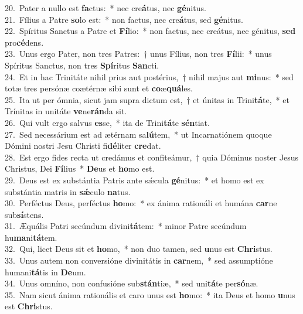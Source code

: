 {20.~}Pater a nullo est \textbf{fa}ctus:~* nec cre\textbf{á}tus, nec \textbf{gé}nitus.\\
{21.~}Fílius a Patre \textbf{so}lo est:~* non factus, nec cre\textbf{á}tus, sed \textbf{gé}nitus.\\
{22.~}Spíritus Sanctus a Patre et \textbf{Fí}lio:~* non factus, nec creátus, nec génitus, \textbf{sed} pro\textbf{cé}dens.\\
{23.~}Unus ergo Pater, non tres Patres:~† unus Fílius, non tres \textbf{Fí}lii:~* unus Spíritus Sanctus, non tres \textbf{Spí}ritus \textbf{San}cti.\\
{24.~}Et in hac Trinitáte nihil prius aut postérius,~† nihil majus aut \textbf{mi}nus:~* sed totæ tres persónæ coætérnæ sibi sunt et \textbf{co}æ\textbf{quá}les.\\
{25.~}Ita ut per ómnia, sicut jam supra dictum est,~† et únitas in Trini\textbf{tá}te,~* et Trínitas in unitáte \textbf{ve}ne\textbf{rán}da sit.\\
{26.~}Qui vult ergo salvus \textbf{es}se,~* ita de Trini\textbf{tá}te \textbf{sén}tiat.\\
{27.~}Sed necessárium est ad ætérnam sa\textbf{lú}tem,~* ut Incarnatiónem quoque Dómini nostri Jesu Christi fi\textbf{dé}liter \textbf{cre}dat.\\
{28.~}Est ergo fides recta ut credámus et confiteámur,~† quia Dóminus noster Jesus Christus, Dei \textbf{Fí}lius~* \textbf{De}us et \textbf{ho}mo est.\\
{29.~}Deus est ex substántia Patris ante sǽcula \textbf{gé}nitus:~* et homo est ex substántia matris in \textbf{sǽ}culo \textbf{na}tus.\\
{30.~}Perféctus Deus, perféctus \textbf{ho}mo:~* ex ánima rationáli et humána \textbf{car}ne sub\textbf{sí}stens.\\
{31.~}Æquális Patri secúndum divini\textbf{tá}tem:~* minor Patre secúndum hu\textbf{ma}ni\textbf{tá}tem.\\
{32.~}Qui, licet Deus sit et \textbf{ho}mo,~* non duo tamen, sed \textbf{u}nus est \textbf{Chri}stus.\\
{33.~}Unus autem non conversióne divinitátis in \textbf{car}nem,~* sed assumptióne humani\textbf{tá}tis in \textbf{De}um.\\
{34.~}Unus omníno, non confusióne sub\textbf{stán}tiæ,~* sed uni\textbf{tá}te per\textbf{só}næ.\\
{35.~}Nam sicut ánima rationális et caro unus est \textbf{ho}mo:~* ita Deus et homo \textbf{u}nus est \textbf{Chri}stus.\\
